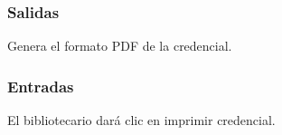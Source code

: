 
\subsubsection{Salidas}
	\begin{Citemize}
		\item Genera el formato PDF de la credencial.
	\end{Citemize}
	
\subsubsection{Entradas}
	\begin{Citemize}
		\item El bibliotecario dará clic en imprimir credencial.
	\end{Citemize}

